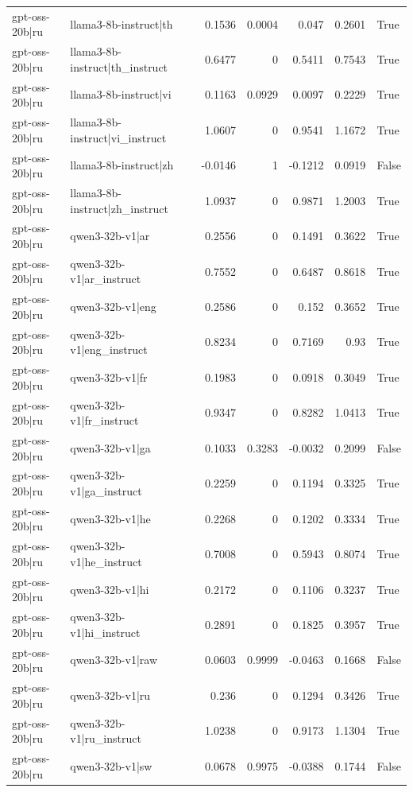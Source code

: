 \begin{table}
\begin{tabular}{l l r r r r l}
gpt-oss-20b|ru & llama3-8b-instruct|th & 0.1536 & 0.0004 & 0.047 & 0.2601 & True \\
gpt-oss-20b|ru & llama3-8b-instruct|th_instruct & 0.6477 & 0 & 0.5411 & 0.7543 & True \\
gpt-oss-20b|ru & llama3-8b-instruct|vi & 0.1163 & 0.0929 & 0.0097 & 0.2229 & True \\
gpt-oss-20b|ru & llama3-8b-instruct|vi_instruct & 1.0607 & 0 & 0.9541 & 1.1672 & True \\
gpt-oss-20b|ru & llama3-8b-instruct|zh & -0.0146 & 1 & -0.1212 & 0.0919 & False \\
gpt-oss-20b|ru & llama3-8b-instruct|zh_instruct & 1.0937 & 0 & 0.9871 & 1.2003 & True \\
gpt-oss-20b|ru & qwen3-32b-v1|ar & 0.2556 & 0 & 0.1491 & 0.3622 & True \\
gpt-oss-20b|ru & qwen3-32b-v1|ar_instruct & 0.7552 & 0 & 0.6487 & 0.8618 & True \\
gpt-oss-20b|ru & qwen3-32b-v1|eng & 0.2586 & 0 & 0.152 & 0.3652 & True \\
gpt-oss-20b|ru & qwen3-32b-v1|eng_instruct & 0.8234 & 0 & 0.7169 & 0.93 & True \\
gpt-oss-20b|ru & qwen3-32b-v1|fr & 0.1983 & 0 & 0.0918 & 0.3049 & True \\
gpt-oss-20b|ru & qwen3-32b-v1|fr_instruct & 0.9347 & 0 & 0.8282 & 1.0413 & True \\
gpt-oss-20b|ru & qwen3-32b-v1|ga & 0.1033 & 0.3283 & -0.0032 & 0.2099 & False \\
gpt-oss-20b|ru & qwen3-32b-v1|ga_instruct & 0.2259 & 0 & 0.1194 & 0.3325 & True \\
gpt-oss-20b|ru & qwen3-32b-v1|he & 0.2268 & 0 & 0.1202 & 0.3334 & True \\
gpt-oss-20b|ru & qwen3-32b-v1|he_instruct & 0.7008 & 0 & 0.5943 & 0.8074 & True \\
gpt-oss-20b|ru & qwen3-32b-v1|hi & 0.2172 & 0 & 0.1106 & 0.3237 & True \\
gpt-oss-20b|ru & qwen3-32b-v1|hi_instruct & 0.2891 & 0 & 0.1825 & 0.3957 & True \\
gpt-oss-20b|ru & qwen3-32b-v1|raw & 0.0603 & 0.9999 & -0.0463 & 0.1668 & False \\
gpt-oss-20b|ru & qwen3-32b-v1|ru & 0.236 & 0 & 0.1294 & 0.3426 & True \\
gpt-oss-20b|ru & qwen3-32b-v1|ru_instruct & 1.0238 & 0 & 0.9173 & 1.1304 & True \\
gpt-oss-20b|ru & qwen3-32b-v1|sw & 0.0678 & 0.9975 & -0.0388 & 0.1744 & False \\

\end{tabular}
\end{table}

